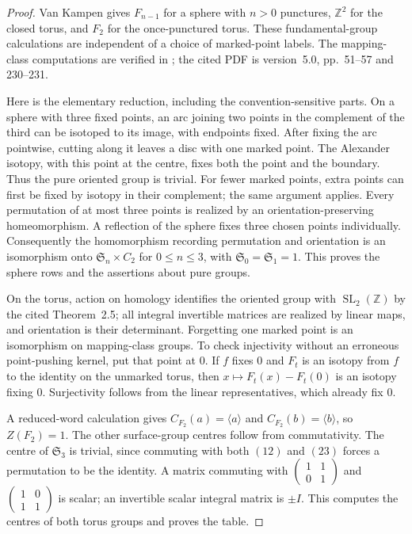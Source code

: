\begin{proof}
Van Kampen gives \(F_{n-1}\) for a sphere with \(n>0\)
punctures, \(\mathbb Z^2\) for the closed torus, and
\(F_2\) for the once-punctured torus.  These fundamental-group
calculations are independent of a choice of marked-point labels.
The mapping-class computations are verified in
\citet[\S\S2.2.1--2.2.2, Proposition~2.3, Theorem~2.5,
the following once-punctured-torus paragraph, and \S8.1]
{A_low_FarbMargalit2012}; the cited PDF is version~5.0,
pp.~51--57 and 230--231.

Here is the elementary reduction, including the convention-sensitive
parts.  On a sphere with three fixed points, an arc joining two
points in the complement of the third can be isotoped to its
image, with endpoints fixed.  After fixing the arc pointwise,
cutting along it leaves a disc with one marked point.  The
Alexander isotopy, with this point at the centre, fixes both
the point and the boundary.  Thus the pure oriented group is
trivial.  For fewer marked points, extra points can first be
fixed by isotopy in their complement; the same argument applies.
Every permutation of at most three points is realized by an
orientation-preserving homeomorphism.  A reflection of the
sphere fixes three chosen points individually.  Consequently
the homomorphism recording permutation and orientation is
an isomorphism onto \(\mathfrak S_n\times C_2\) for
\(0\leq n\leq3\), with \(\mathfrak S_0=\mathfrak S_1=1\).
This proves the sphere rows and the assertions about pure groups.

On the torus, action on homology identifies the oriented group
with \(\operatorname{SL}_2(\mathbb Z)\) by the cited
Theorem~2.5; all integral invertible matrices are realized by
linear maps, and orientation is their determinant.
Forgetting one marked point is an isomorphism on mapping-class
groups.  To check injectivity without an erroneous point-pushing
kernel, put that point at \(0\).  If \(f\) fixes \(0\) and
\(F_t\) is an isotopy from \(f\) to the identity on the
unmarked torus, then \(x\mapsto F_t(x)-F_t(0)\) is an
isotopy fixing \(0\).  Surjectivity follows from the linear
representatives, which already fix \(0\).

A reduced-word calculation gives
\(C_{F_2}(a)=\langle a\rangle\) and
\(C_{F_2}(b)=\langle b\rangle\), so \(Z(F_2)=1\).
The other surface-group centres follow from commutativity.
The centre of \(\mathfrak S_3\) is trivial, since commuting
with both \((12)\) and \((23)\) forces a permutation to be
the identity.  A matrix commuting with
\(\left(\begin{smallmatrix}1&1\\0&1\end{smallmatrix}\right)\)
and \(\left(\begin{smallmatrix}1&0\\1&1\end{smallmatrix}\right)\)
is scalar; an invertible scalar integral matrix is \(\pm I\).
This computes the centres of both torus groups and proves the table.
\end{proof}


